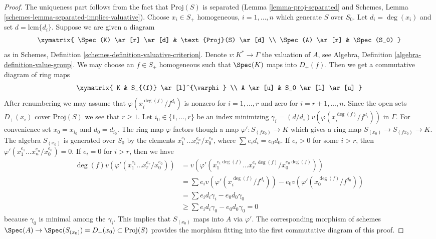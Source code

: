 \begin{proof}
The uniqueness part follows from the fact that $\text{Proj}(S)$ is
separated (Lemma \ref{lemma-proj-separated} and
Schemes, Lemma \ref{schemes-lemma-separated-implies-valuative}).
Choose $x_i \in S_{+}$ homogeneous, $i = 1, \ldots, n$
which generate $S$ over $S_0$. Let $d_i = \deg(x_i)$ and
set $d = \text{lcm}\{d_i\}$. Suppose we are given a diagram
$$
\xymatrix{
\Spec(K) \ar[r] \ar[d] & \text{Proj}(S) \ar[d] \\
\Spec(A) \ar[r] & \Spec(S_0)
}
$$
as in Schemes, Definition \ref{schemes-definition-valuative-criterion}.
Denote $v : K^* \to \Gamma$ the valuation of $A$, see
Algebra, Definition \ref{algebra-definition-value-group}.
We may choose an $f \in S_{+}$ homogeneous such that
$\Spec(K)$ maps into $D_{+}(f)$. Then we get a commutative
diagram of ring maps
$$
\xymatrix{
K & S_{(f)} \ar[l]^{\varphi} \\
A \ar[u] & S_0 \ar[l] \ar[u]
}
$$
After renumbering we may assume that $\varphi(x_i^{\deg(f)}/f^{d_i})$
is nonzero for $i = 1, \ldots, r$ and zero for $i = r + 1, \ldots, n$.
Since the open sets $D_{+}(x_i)$ cover $\text{Proj}(S)$ we see that $r \geq 1$.
Let $i_0 \in \{1, \ldots, r\}$ be an index minimizing
$\gamma_i = (d/d_i)v(\varphi(x_i^{\deg(f)}/f^{d_i}))$ in $\Gamma$.
For convenience set $x_0 = x_{i_0}$ and $d_0 = d_{i_0}$.
The ring map $\varphi$ factors though a map $\varphi' : S_{(fx_0)} \to K$
which gives a ring map $S_{(x_0)} \to S_{(fx_0)} \to K$.
The algebra $S_{(x_0)}$ is generated over $S_0$ by the elements
$x_1^{e_1} \ldots x_n^{e_n}/x_0^{e_0}$, where $\sum e_i d_i = e_0 d_0$.
If $e_i > 0$ for some $i > r$, then
$\varphi'(x_1^{e_1} \ldots x_n^{e_n}/x_0^{e_0}) = 0$.
If $e_i = 0$ for $i > r$, then we have
\begin{align*}
\deg(f) v(\varphi'(x_1^{e_1} \ldots x_r^{e_r}/x_0^{e_0}))
& =
v(\varphi'(x_1^{e_1 \deg(f)} \ldots x_r^{e_r \deg(f)}/x_0^{e_0 \deg(f)})) \\
& =
\sum e_i v(\varphi'(x_i^{\deg(f)}/f^{d_i}))
- e_0 v(\varphi'(x_0^{\deg(f)}/f^{d_0})) \\
& =
\sum e_i d_i \gamma_i - e_0 d_0 \gamma_0 \\
& \geq
\sum e_i d_i \gamma_0 - e_0 d_0 \gamma_0 = 0
\end{align*}
because $\gamma_0$ is minimal among the $\gamma_i$.
This implies that $S_{(x_0)}$ maps into $A$ via $\varphi'$.
The corresponding morphism of schemes
$\Spec(A) \to \Spec(S_{(x_0)}) = D_{+}(x_0)
\subset \text{Proj}(S)$ provides the morphism fitting into
the first commutative diagram of this proof.
\end{proof}

